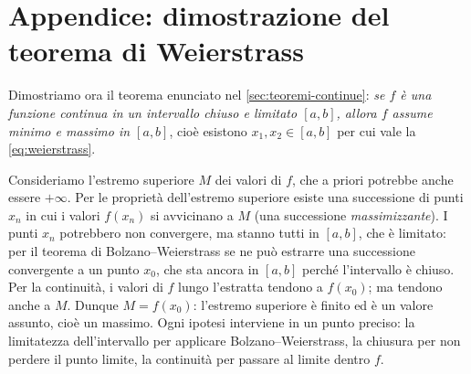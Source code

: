 \section{Appendice: dimostrazione del teorema di Weierstrass}
\label{sec:dim-weierstrass}

Dimostriamo ora il teorema enunciato nel \cref{sec:teoremi-continue}: \emph{se $f$ è una
funzione continua in un intervallo chiuso e limitato $[a,b]$, allora $f$ assume minimo e
massimo in $[a,b]$}, cioè esistono $x_{1},x_{2}\in[a,b]$ per cui vale la
\eqref{eq:weierstrass}.

\begin{strategia}
Consideriamo l'estremo superiore $M$ dei valori di $f$, che a priori potrebbe anche
essere $+\infty$. Per le proprietà dell'estremo superiore esiste una successione di punti
$x_{n}$ in cui i valori $f(x_{n})$ si avvicinano a $M$ (una successione
\emph{massimizzante}). I punti $x_{n}$ potrebbero non convergere, ma stanno tutti in
$[a,b]$, che è limitato: per il teorema di Bolzano--Weierstrass se ne può estrarre una
successione convergente a un punto $x_{0}$, che sta ancora in $[a,b]$ perché
l'intervallo è chiuso. Per la continuità, i valori di $f$ lungo l'estratta tendono a
$f(x_{0})$; ma tendono anche a $M$. Dunque $M=f(x_{0})$: l'estremo superiore è finito ed
è un valore assunto, cioè un massimo. Ogni ipotesi interviene in un punto preciso: la
limitatezza dell'intervallo per applicare Bolzano--Weierstrass, la chiusura per non
perdere il punto limite, la continuità per passare al limite dentro $f$.
\end{strategia}

